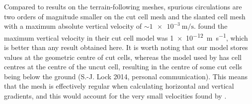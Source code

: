 Compared to results on the terrain-following meshes, spurious circulations are two orders of magnitude smaller on the cut cell mesh and the slanted cell mesh with a maximum absolute vertical velocity of $\sim \SI{1e-3}{\meter\per\second}$.
\citet{good2014} found the maximum vertical velocity in their cut cell model was \SI{1e-12}{\meter\per\second}, which is better than any result obtained here.  It is worth noting that our model stores values at the geometric centre of cut cells, whereas the model used by \citet{good2014} has cell centres at the centre of the uncut cell, resulting in the centre of some cut cells being below the ground (S.-J. Lock 2014, personal communication).
This means that the mesh is effectively regular when calculating horizontal and vertical gradients, and this would account for the very small velocities found by \citet{good2014}.

